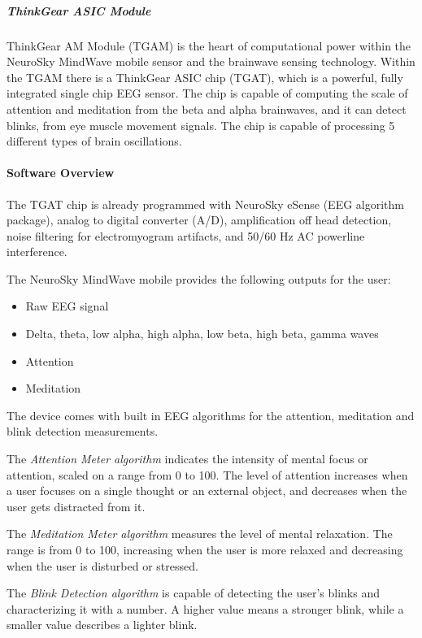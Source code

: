\documentclass[letterpaper,10pt]{article}
\begin{document}
\subparagraph{ThinkGear ASIC Module}

ThinkGear AM Module (TGAM) is the heart of computational power within the NeuroSky MindWave mobile sensor and the brainwave sensing technology. Within the TGAM there is a ThinkGear ASIC chip (TGAT), which is a powerful, fully integrated single chip EEG sensor. The chip is capable of computing the scale of attention and meditation from the beta and alpha brainwaves, and it can detect blinks, from eye muscle movement signals. The chip is capable of processing 5 different types of brain oscillations. \cite{neurosky}


\paragraph{Software Overview}

The TGAT chip is already programmed with NeuroSky eSense (EEG algorithm package), analog to digital converter (A/D), amplification off head detection, noise filtering for electromyogram artifacts, and 50/60 Hz AC powerline interference. \cite{neurosky}

The NeuroSky MindWave mobile provides the following outputs for the user: 
\begin{itemize}
\item Raw EEG signal
\item Delta, theta, low alpha, high alpha, low beta, high beta, gamma waves
\item Attention
\item Meditation
\end{itemize}

The device comes with built in EEG algorithms for the attention, meditation and blink detection measurements.

The \textit{Attention Meter algorithm} indicates the intensity of mental focus or attention, scaled on a range from 0 to 100. The level of attention increases when a user focuses on a single thought or an external object, and decreases when the user gets distracted from it. \cite{neurosky}

The \textit{Meditation Meter algorithm} measures the level of mental relaxation. The range is from 0 to 100, increasing when the user is more relaxed and decreasing when the user is disturbed or stressed. \cite{neurosky}

The \textit{Blink Detection algorithm} is capable of detecting the user's blinks and characterizing it with a number. A higher value means a stronger blink, while a smaller value describes a lighter blink. \cite{neurosky}
\end{document}
